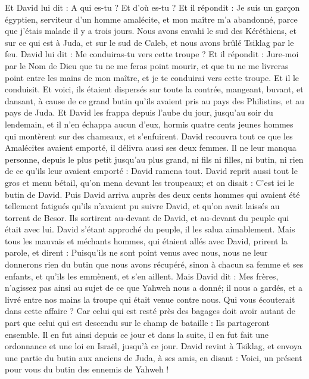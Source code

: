\begin{multicols}{2}
Et David lui dit : A qui es-tu ? Et d'où es-tu ? Et il répondit : Je suis un garçon égyptien, serviteur d'un homme amalécite, et mon maître m'a abandonné, parce que j'étais malade il y a trois jours.
Nous avons envahi le sud des Kéréthiens, et sur ce qui est à Juda, et sur le sud de Caleb, et nous avons brûlé Tsiklag par le feu.
David lui dit : Me conduiras-tu vers cette troupe ? Et il répondit : Jure-moi par le Nom de Dieu que tu ne me feras point mourir, et que tu ne me livreras point entre les mains de mon maître, et je te conduirai vers cette troupe.
Et il le conduisit. Et voici, ils étaient dispersés sur toute la contrée, mangeant, buvant, et dansant, à cause de ce grand butin qu'ils avaient pris au pays des Philistins, et au pays de Juda.
Et David les frappa depuis l'aube du jour, jusqu'au soir du lendemain, et il n'en échappa aucun d'eux, hormis quatre cents jeunes hommes qui montèrent sur des chameaux, et s'enfuirent.
David recouvra tout ce que les Amalécites avaient emporté, il délivra aussi ses deux femmes.
Il ne leur manqua personne, depuis le plus petit jusqu'au plus grand, ni fils ni filles, ni butin, ni rien de ce qu'ils leur avaient emporté : David ramena tout.
David reprit aussi tout le gros et menu bétail, qu'on mena devant les troupeaux; et on disait : C'est ici le butin de David.
Puis David arriva auprès des deux cents hommes qui avaient été tellement fatigués qu'ils n'avaient pu suivre David, et qu'on avait laissés au torrent de Besor. Ils sortirent au-devant de David, et au-devant du peuple qui était avec lui. David s'étant approché du peuple, il les salua aimablement.
Mais tous les mauvais et méchants hommes, qui étaient allés avec David, prirent la parole, et dirent : Puisqu'ils ne sont point venus avec nous, nous ne leur donnerons rien du butin que nous avons récupéré, sinon à chacun sa femme et ses enfants, et qu'ils les emmènent, et s'en aillent.
Mais David dit : Mes frères, n'agissez pas ainsi au sujet de ce que Yahweh nous a donné; il nous a gardés, et a livré entre nos mains la troupe qui était venue contre nous.
Qui vous écouterait dans cette affaire ? Car celui qui est resté près des bagages doit avoir autant de part que celui qui est descendu sur le champ de bataille : Ils partageront ensemble.
Il en fut ainsi depuis ce jour et dans la suite, il en fut fait une ordonnance et une loi en Israël, jusqu'à ce jour.
David revint à Tsiklag, et envoya une partie du butin aux anciens de Juda, à ses amis, en disant : Voici, un présent pour vous du butin des ennemis de Yahweh !

\end{multicols}
